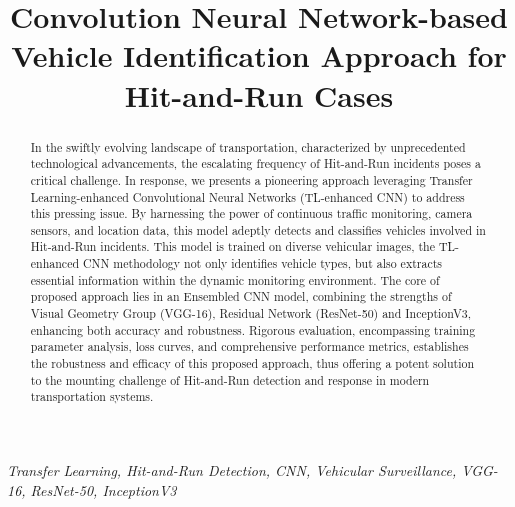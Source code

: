 \documentclass[10pt, conference, a4paper, compsocconf]{IEEEtran}
\begin{document}
\title{Convolution Neural Network-based Vehicle Identification Approach for Hit-and-Run Cases}
\author{

}
\maketitle

\begin{abstract}
In the swiftly evolving landscape of transportation, characterized by unprecedented technological advancements, the escalating frequency of Hit-and-Run incidents poses a critical challenge. In response, we presents a pioneering approach leveraging Transfer Learning-enhanced Convolutional Neural Networks (TL-enhanced CNN) to address this pressing issue. By harnessing the power of continuous traffic monitoring, camera sensors, and location data, this model adeptly detects and classifies vehicles involved in Hit-and-Run incidents. This model is trained on diverse vehicular images, the TL-enhanced CNN methodology not only identifies vehicle types, but also extracts essential information within the dynamic monitoring environment. The core of proposed approach lies in an Ensembled CNN model, combining the strengths of Visual Geometry Group (VGG-16), Residual Network (ResNet-50) and InceptionV3, enhancing both accuracy and robustness. Rigorous evaluation, encompassing training parameter analysis, loss curves, and comprehensive performance metrics, establishes the robustness and efficacy of this proposed approach, thus offering a potent solution to the mounting challenge of Hit-and-Run detection and response in modern transportation systems.
\end{abstract}
\begin{IEEEkeywords}
\textit{Transfer Learning, Hit-and-Run Detection, CNN, Vehicular Surveillance, VGG-16, ResNet-50, InceptionV3}
\end{IEEEkeywords}
\IEEEpeerreviewmaketitle
\end{document}
